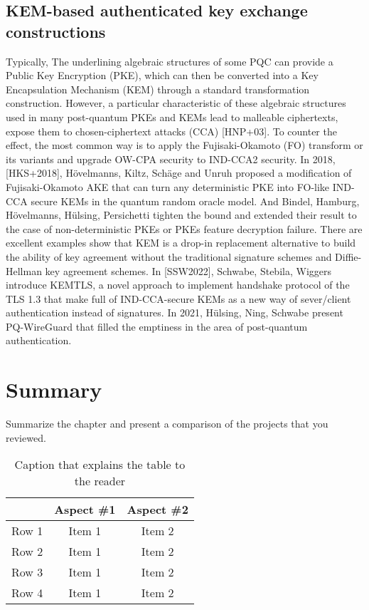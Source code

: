 \subsection{KEM-based authenticated key exchange constructions}
Typically, The underlining algebraic structures of some PQC can provide a Public Key Encryption (PKE), which can then be converted into a Key Encapsulation Mechanism (KEM) through a standard transformation construction. However, a particular characteristic of these algebraic structures used in many post-quantum PKEs and KEMs lead to malleable ciphertexts, expose them to chosen-ciphertext attacks (CCA) [HNP+03]. To counter the effect, the most common way is to apply the Fujisaki-Okamoto (FO) transform or its variants and upgrade OW-CPA security to IND-CCA2 security. In 2018,[HKS+2018], Hövelmanns, Kiltz, Schäge and Unruh proposed a modification of Fujisaki-Okamoto AKE that can turn any deterministic PKE into FO-like IND-CCA secure KEMs in the quantum random oracle model. And Bindel, Hamburg, Hövelmanns, Hülsing, Persichetti tighten the bound and extended their result to the case of non-deterministic PKEs or PKEs feature decryption failure. There are excellent examples show that KEM is a drop-in replacement alternative to build the ability of key agreement without the traditional signature schemes and Diffie-Hellman key agreement schemes. In [SSW2022],  Schwabe, Stebila, Wiggers introduce KEMTLS, a novel approach to implement handshake protocol of the TLS 1.3 that make full of IND-CCA-secure KEMs as a new way of sever/client authentication instead of signatures. In 2021, Hülsing, Ning, Schwabe present PQ-WireGuard that filled the emptiness in the area of post-quantum authentication.


\section{Summary}

Summarize the chapter and present a comparison of the projects that you reviewed.

\begin{table}[!h]
\begin{center}
	\begin{tabular}{|l|c|c|} 
	\hline
 	\bf  & \bf Aspect \#1  & \bf Aspect \#2 \\
  	\hline
	Row 1 & Item 1 & Item 2 \\
	Row 2 & Item 1 & Item 2 \\
	Row 3 & Item 1 & Item 2 \\
	Row 4 & Item 1 & Item 2 \\
	\hline
	\end{tabular}
\end{center}
\caption[Comparison of Closely-Related Projects]{Caption that explains the table to the reader}	
\label{tab:SummaryProjects}
\end{table}
